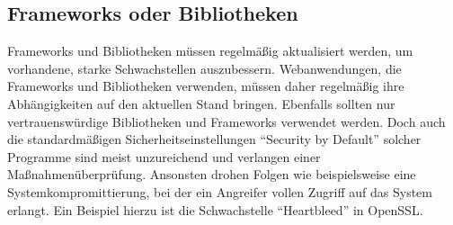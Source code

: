 \subsection{Frameworks oder Bibliotheken}
Frameworks und Bibliotheken müssen regelmäßig aktualisiert werden, um vorhandene, starke Schwachstellen auszubessern.
Webanwendungen, die Frameworks und Bibliotheken verwenden, müssen daher regelmäßig ihre Abhängigkeiten auf den aktuellen Stand bringen. Ebenfalls sollten nur vertrauenswürdige Bibliotheken und Frameworks verwendet werden. Doch auch die standardmäßigen Sicherheitseinstellungen \enquote{Security by Default} solcher Programme sind meist unzureichend und verlangen einer Maßnahmenüberprüfung.
Ansonsten drohen Folgen wie beispielsweise eine Systemkompromittierung, bei der ein Angreifer vollen Zugriff auf das System erlangt. 
Ein Beispiel hierzu ist die Schwachstelle \enquote{Heartbleed} in OpenSSL.
